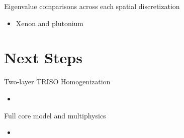 \documentclass[9pt,t,aspectratio=169]{beamer}
\begin{document}
\begin{frame}{Eigenvalue comparisons across each spatial discretization}
    \begin{itemize}
        \item Xenon and plutonium
    \end{itemize}
\end{frame}

\section{Next Steps}
\begin{frame}{Two-layer TRISO Homogenization}
    \begin{itemize}
        \item
    \end{itemize}
\end{frame}

\begin{frame}{Full core model and multiphysics}
    \begin{itemize}
        \item
    \end{itemize}
\end{frame}


\end{document}
